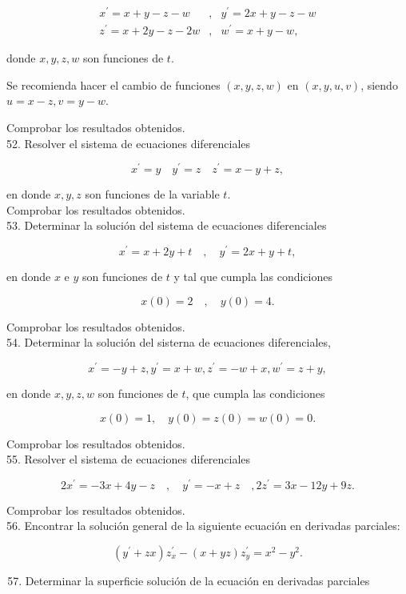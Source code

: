 \documentclass[10pt]{article}
\theoremstyle{plain}
\theoremstyle{definition}
\theoremstyle{remark}
\begin{document}
$$
\begin{array}{lll}
x^{\prime}=x+y-z-w & , & y^{\prime}=2 x+y-z-w \\
z^{\prime}=x+2 y-z-2 w & , & w^{\prime}=x+y-w,
\end{array}
$$

donde $x, y, z, w$ son funciones de $t$.


Se recomienda hacer el cambio de funciones $(x, y, z, w)$ en $(x, y, u, v)$, siendo $u=x-z, v=y-w$.

Comprobar los resultados obtenidos.\\
52. Resolver el sistema de ecuaciones diferenciales

$$
x^{\prime}=y \quad y^{\prime}=z \quad z^{\prime}=x-y+z,
$$

en donde $x, y, z$ son funciones de la variable $t$.\\
Comprobar los resultados obtenidos.\\
53. Determinar la solución del sistema de ecuaciones diferenciales

$$
x^{\prime}=x+2 y+t \quad, \quad y^{\prime}=2 x+y+t,
$$

en donde $x$ e $y$ son funciones de $t$ y tal que cumpla las condiciones

$$
x(0)=2 \quad, \quad y(0)=4 .
$$

Comprobar los resultados obtenidos.\\
54. Determinar la solución del sisterna de ecuaciones diferenciales,

$$
x^{\prime}=-y+z, y^{\prime}=x+w, z^{\prime}=-w+x, w^{\prime}=z+y,
$$

en donde $x, y, z, w$ son funciones de $t$, que cumpla las condiciones

$$
x(0)=1, \quad y(0)=z(0)=w(0)=0 .
$$

Comprobar los resultados obtenidos.\\
55. Resolver el sistema de ecuaciones diferenciales

$$
2 x^{\prime}=-3 x+4 y-z \quad, \quad y^{\prime}=-x+z \quad, 2 z^{\prime}=3 x-12 y+9 z .
$$

Comprobar los resultados obtenidos.\\
56. Encontrar la solución general de la siguiente ecuación en derivadas parciales:

$$
\left(y^{\prime}+z x\right) z_{x}^{\prime}-(x+y z) z_{y}^{\prime}=x^{2}-y^{2} .
$$

\begin{enumerate}
  \setcounter{enumi}{56}
  \item Determinar la superficie solución de la ecuación en derivadas parciales
\end{enumerate}
\end{document}
